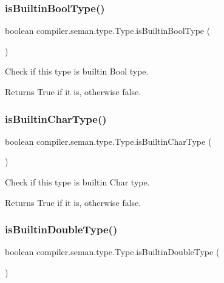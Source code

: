\subsubsection{\texorpdfstring{is\+Builtin\+Bool\+Type()}{isBuiltinBoolType()}}
{\footnotesize\ttfamily boolean compiler.\+seman.\+type.\+Type.\+is\+Builtin\+Bool\+Type (\begin{DoxyParamCaption}{ }\end{DoxyParamCaption})}

Check if this type is builtin Bool type. \begin{DoxyReturn}{Returns}
True if it is, otherwise false. 
\end{DoxyReturn}
\mbox{\label{classcompiler_1_1seman_1_1type_1_1_type_af50d2295a7d1d3083631f58d30d2312a}} 
\subsubsection{\texorpdfstring{is\+Builtin\+Char\+Type()}{isBuiltinCharType()}}
{\footnotesize\ttfamily boolean compiler.\+seman.\+type.\+Type.\+is\+Builtin\+Char\+Type (\begin{DoxyParamCaption}{ }\end{DoxyParamCaption})}

Check if this type is builtin Char type. \begin{DoxyReturn}{Returns}
True if it is, otherwise false. 
\end{DoxyReturn}
\mbox{\label{classcompiler_1_1seman_1_1type_1_1_type_a615beef2ebd01cc0bc817b4505c90401}} 
\subsubsection{\texorpdfstring{is\+Builtin\+Double\+Type()}{isBuiltinDoubleType()}}
{\footnotesize\ttfamily boolean compiler.\+seman.\+type.\+Type.\+is\+Builtin\+Double\+Type (\begin{DoxyParamCaption}{ }\end{DoxyParamCaption})}

